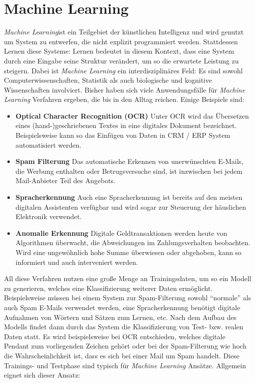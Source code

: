 \section{Machine Learning}

\textit{Machine Learning}ist ein Teilgebiet der künstlichen Intelligenz und wird genutzt um System zu entwerfen, die nicht explizit programmiert werden. Stattdessen Lernen diese Systeme: Lernen bedeutet in diesem Kontext, dass eine System durch eine Eingabe seine Struktur verändert, um so die erwartete Leistung zu steigern. Dabei ist \textit{Machine Learning} ein interdisziplinäres Feld: Es sind sowohl Computerwissenschaften, Statistik als auch biologische und kognitive Wissenschaften involviert. Bisher haben sich viele Anwendungsfälle für \textit{Machine Learning} Verfahren ergeben, die bis in den Alltag reichen. Einige Beispiele sind:

\begin{itemize}
	\item \textbf{Optical Character Recognition (OCR)} Unter OCR wird das Übersetzen eines (hand-)geschriebenen Textes in eine digitales Dokument bezeichnet. Beispielsweise kann so das Einfügen von Daten in CRM / ERP System automatisiert werden.
	\item \textbf{Spam Filterung} Das automatische Erkennen von unerwünschten E-Mails, die Werbung enthalten oder Betrugsversuche sind, ist inzwischen bei jedem Mail-Anbieter Teil des Angebots.
	\item \textbf{Spracherkennung} Auch eine Spracherkennung ist bereits auf den meisten digitalen Assistenten verfügbar und wird sogar zur Steuerung der häuslichen Elektronik verwendet.
	\item \textbf{Anomalie Erkennung} Digitale Geldtransaktionen werden heute von Algorithmen überwacht, die Abweichungen im Zahlungsverhalten beobachten. Wird eine ungewöhnlich hohe Summe überwiesen oder abgehoben, kann so informiert und auch interveniert werden.
\end{itemize}

All diese Verfahren nutzen eine große Menge an Trainingsdaten, um so ein Modell zu generieren, welches eine Klassifizierung weiterer Daten ermöglicht. Beispielsweise müssen bei einem System zur Spam-Filterung sowohl \enquote{normale} als auch Spam E-Mails verwendet werden, eine Spracherkennung benötigt digitale Aufnahmen von Wörtern und Sätzen zum Lernen, etc.
Nach dem Aufbau des Modells findet dann durch das System die Klassifizierung von Test- bzw. realen Daten statt. Es wird beispielsweise bei OCR entschieden, welches digitale Pendant zum vorliegenden Zeichen gehört oder bei der Spam-Filterung wie hoch die Wahrscheinlichkeit ist, dass es sich bei einer Mail um Spam handelt. Diese Trainings- und Testphase sind typisch für \textit{Machine Learning} Ansätze. Allgemein eignet sich dieser Ansatz:


